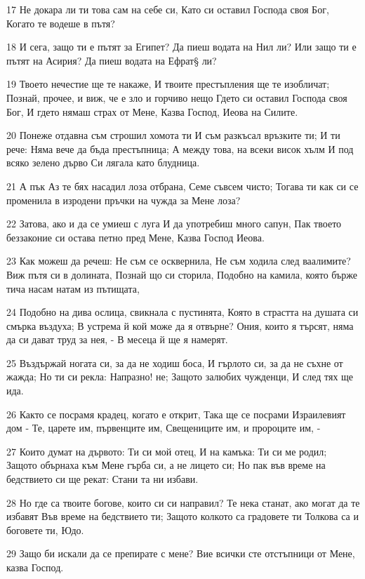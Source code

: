 \par 17 Не докара ли ти това сам на себе си, Като си оставил Господа своя Бог, Когато те водеше в пътя?
\par 18 И сега, защо ти е пътят за Египет? Да пиеш водата на Нил ли? Или защо ти е пътят на Асирия? Да пиеш водата на Ефрат§ ли?
\par 19 Твоето нечестие ще те накаже, И твоите престъпления ще те изобличат; Познай, прочее, и виж, че е зло и горчиво нещо Гдето си оставил Господа своя Бог, И гдето нямаш страх от Мене, Казва Господ, Иеова на Силите.
\par 20 Понеже отдавна съм строшил хомота ти И съм разкъсал връзките ти; И ти рече: Няма вече да бъда престъпница; А между това, на всеки висок хълм И под всяко зелено дърво Си лягала като блудница.
\par 21 А пък Аз те бях насадил лоза отбрана, Семе съвсем чисто; Тогава ти как си се променила в изродени пръчки на чужда за Мене лоза?
\par 22 Затова, ако и да се умиеш с луга И да употребиш много сапун, Пак твоето беззаконие си остава петно пред Мене, Казва Господ Иеова.
\par 23 Как можеш да речеш: Не съм се осквернила, Не съм ходила след ваалимите? Виж пътя си в долината, Познай що си сторила, Подобно на камила, която бърже тича насам натам из пътищата,
\par 24 Подобно на дива ослица, свикнала с пустинята, Която в страстта на душата си смърка въздуха; В устрема й кой може да я отвърне? Ония, които я търсят, няма да си дават труд за нея, - В месеца й ще я намерят.
\par 25 Въздържай ногата си, за да не ходиш боса, И гърлото си, за да не съхне от жажда; Но ти си рекла: Напразно! не; Защото залюбих чужденци, И след тях ще ида.
\par 26 Както се посрамя крадец, когато е открит, Така ще се посрами Израилевият дом - Те, царете им, първенците им, Свещениците им, и пророците им, -
\par 27 Които думат на дървото: Ти си мой отец, И на камъка: Ти си ме родил; Защото обърнаха към Мене гърба си, а не лицето си; Но пак във време на бедствието си ще рекат: Стани та ни избави.
\par 28 Но где са твоите богове, които си си направил? Те нека станат, ако могат да те избавят Във време на бедствието ти; Защото колкото са градовете ти Толкова са и боговете ти, Юдо.
\par 29 Защо би искали да се препирате с мене? Вие всички сте отстъпници от Мене, казва Господ.
